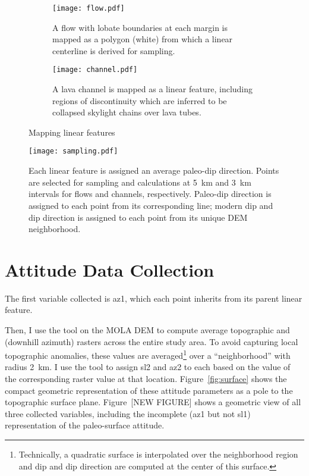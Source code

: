 \begin{figure}
    \centering
    \begin{subfigure}{\textwidth}
        \centering
        \texttt{[image: flow.pdf]}
        \caption[Mapped lava flow \& centerline]{A flow with lobate boundaries at each margin is mapped as a polygon (white) from which a linear centerline is derived for sampling.}%
        \label{fig:flow}
    \end{subfigure}
    \begin{subfigure}{\textwidth}
        \centering
        \texttt{[image: channel.pdf]}
        \caption[Mapped lava channel]{A lava channel is mapped as a linear feature, including regions of discontinuity which are inferred to be collapsed skylight chains over lava tubes.}%
        \label{fig:channel}
    \end{subfigure}
    \caption{Mapping linear features}%
    \label{fig:mapping-linear}
\end{figure}

\begin{figure}
    \centering
    \texttt{[image: sampling.pdf]}
    \caption[Sampling site selection]{Each linear feature is assigned an average paleo-dip direction. Points are selected for sampling and calculations at \qty{5}{\km} and \qty{3}{\km} intervals for flows and channels, respectively. Paleo-dip direction is assigned to each point from its corresponding line; modern dip and dip direction is assigned to each point from its unique \ac{DEM} neighborhood.}%
    \label{fig:sampling}
\end{figure}

\section{Attitude Data Collection}

\newcommand{\neighborhood}{\qty{2}{\km}}

The first variable collected is \ac{az1}, which each point inherits from its parent linear feature.

Then, I use the  tool on the \ac{MOLA} \ac{DEM} to compute average topographic  and  (downhill azimuth) rasters across the entire study area. To avoid capturing local topographic anomalies, these values are averaged\footnote{Technically, a quadratic surface is interpolated over the neighborhood region and dip and dip direction are computed at the center of this surface.} over a ``neighborhood'' with radius \neighborhood. I use the  tool to assign \ac{sl2} and \ac{az2} to each based on the value of the corresponding raster value at that location. Figure~\ref{fig:surface} shows the compact geometric representation of these attitude parameters as a pole to the topographic surface plane. Figure~[NEW FIGURE] shows a geometric view of all three collected variables, including the incomplete (\acs{az1} but not \acs{sl1}) representation of the paleo-surface attitude.

